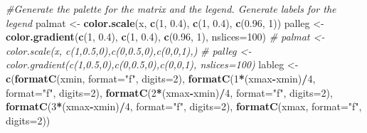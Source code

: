 \documentclass[]{article}
\newenvironment{Shaded}{\begin{snugshade}}{\end{snugshade}}
\newcommand{\CommentTok}[1]{\textcolor[rgb]{0.56,0.35,0.01}{\textit{#1}}}
\newcommand{\DataTypeTok}[1]{\textcolor[rgb]{0.13,0.29,0.53}{#1}}
\newcommand{\DecValTok}[1]{\textcolor[rgb]{0.00,0.00,0.81}{#1}}
\newcommand{\FloatTok}[1]{\textcolor[rgb]{0.00,0.00,0.81}{#1}}
\newcommand{\KeywordTok}[1]{\textcolor[rgb]{0.13,0.29,0.53}{\textbf{#1}}}
\newcommand{\NormalTok}[1]{#1}
\newcommand{\OperatorTok}[1]{\textcolor[rgb]{0.81,0.36,0.00}{\textbf{#1}}}
\newcommand{\StringTok}[1]{\textcolor[rgb]{0.31,0.60,0.02}{#1}}
\begin{document}
\begin{Shaded}
\begin{Highlighting}[]
  \CommentTok{#Generate the palette for the matrix and the legend.  Generate labels for the legend}
\NormalTok{  palmat <-}\StringTok{ }\KeywordTok{color.scale}\NormalTok{(x, }\KeywordTok{c}\NormalTok{(}\DecValTok{1}\NormalTok{, }\FloatTok{0.4}\NormalTok{), }\KeywordTok{c}\NormalTok{(}\DecValTok{1}\NormalTok{, }\FloatTok{0.4}\NormalTok{), }\KeywordTok{c}\NormalTok{(}\FloatTok{0.96}\NormalTok{, }\DecValTok{1}\NormalTok{))}
\NormalTok{  palleg <-}\StringTok{ }\KeywordTok{color.gradient}\NormalTok{(}\KeywordTok{c}\NormalTok{(}\DecValTok{1}\NormalTok{, }\FloatTok{0.4}\NormalTok{), }\KeywordTok{c}\NormalTok{(}\DecValTok{1}\NormalTok{, }\FloatTok{0.4}\NormalTok{), }\KeywordTok{c}\NormalTok{(}\FloatTok{0.96}\NormalTok{, }\DecValTok{1}\NormalTok{), }\DataTypeTok{nslices=}\DecValTok{100}\NormalTok{)}
  \CommentTok{# palmat <- color.scale(x, c(1,0.5,0),c(0,0.5,0),c(0,0,1),)}
  \CommentTok{# palleg <- color.gradient(c(1,0.5,0),c(0,0.5,0),c(0,0,1), nslices=100)}
\NormalTok{  lableg <-}\StringTok{ }\KeywordTok{c}\NormalTok{(}\KeywordTok{formatC}\NormalTok{(xmin, }\DataTypeTok{format=}\StringTok{"f"}\NormalTok{, }\DataTypeTok{digits=}\DecValTok{2}\NormalTok{), }\KeywordTok{formatC}\NormalTok{(}\DecValTok{1}\OperatorTok{*}\NormalTok{(xmax}\OperatorTok{-}\NormalTok{xmin)}\OperatorTok{/}\DecValTok{4}\NormalTok{, }\DataTypeTok{format=}\StringTok{"f"}\NormalTok{, }\DataTypeTok{digits=}\DecValTok{2}\NormalTok{), }\KeywordTok{formatC}\NormalTok{(}\DecValTok{2}\OperatorTok{*}\NormalTok{(xmax}\OperatorTok{-}\NormalTok{xmin)}\OperatorTok{/}\DecValTok{4}\NormalTok{, }\DataTypeTok{format=}\StringTok{"f"}\NormalTok{, }\DataTypeTok{digits=}\DecValTok{2}\NormalTok{), }\KeywordTok{formatC}\NormalTok{(}\DecValTok{3}\OperatorTok{*}\NormalTok{(xmax}\OperatorTok{-}\NormalTok{xmin)}\OperatorTok{/}\DecValTok{4}\NormalTok{, }\DataTypeTok{format=}\StringTok{"f"}\NormalTok{, }\DataTypeTok{digits=}\DecValTok{2}\NormalTok{), }\KeywordTok{formatC}\NormalTok{(xmax, }\DataTypeTok{format=}\StringTok{"f"}\NormalTok{, }\DataTypeTok{digits=}\DecValTok{2}\NormalTok{))}
  

\end{Highlighting}
\end{Shaded}
\end{document}
